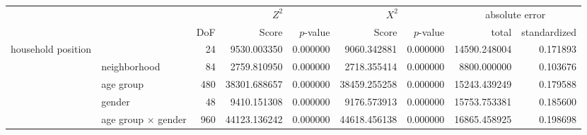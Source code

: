 \begin{tabular}{ll|r|rr|rr|rr}
\toprule
 &  &  & \multicolumn{2}{|c}{$Z^2$} & \multicolumn{2}{|c}{$X^2$} & \multicolumn{2}{|c}{absolute error} \\
 &  & DoF & Score & $p$-value & Score & $p$-value & total & standardized \\
\midrule
\multirow[t]{5}{*}{household position} &  & 24 & 9530.003350 & 0.000000 & 9060.342881 & 0.000000 & 14590.248004 & 0.171893 \\
 & neighborhood & 84 & 2759.810950 & 0.000000 & 2718.355414 & 0.000000 & 8800.000000 & 0.103676 \\
 & age group & 480 & 38301.688657 & 0.000000 & 38459.255258 & 0.000000 & 15243.439249 & 0.179588 \\
 & gender & 48 & 9410.151308 & 0.000000 & 9176.573913 & 0.000000 & 15753.753381 & 0.185600 \\
 & age group $\times$ gender & 960 & 44123.136242 & 0.000000 & 44618.456138 & 0.000000 & 16865.458925 & 0.198698 \\
\cline{1-9}
\bottomrule
\end{tabular}
